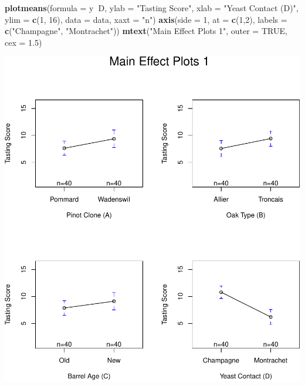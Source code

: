 \documentclass[]{article}
\newenvironment{Shaded}{\begin{snugshade}}{\end{snugshade}}
\newcommand{\DataTypeTok}[1]{\textcolor[rgb]{0.13,0.29,0.53}{#1}}
\newcommand{\DecValTok}[1]{\textcolor[rgb]{0.00,0.00,0.81}{#1}}
\newcommand{\FloatTok}[1]{\textcolor[rgb]{0.00,0.00,0.81}{#1}}
\newcommand{\KeywordTok}[1]{\textcolor[rgb]{0.13,0.29,0.53}{\textbf{#1}}}
\newcommand{\NormalTok}[1]{#1}
\newcommand{\OperatorTok}[1]{\textcolor[rgb]{0.81,0.36,0.00}{\textbf{#1}}}
\newcommand{\OtherTok}[1]{\textcolor[rgb]{0.56,0.35,0.01}{#1}}
\newcommand{\StringTok}[1]{\textcolor[rgb]{0.31,0.60,0.02}{#1}}
\begin{document}
\begin{Shaded}
\begin{Highlighting}[]
\KeywordTok{plotmeans}\NormalTok{(}\DataTypeTok{formula =}\NormalTok{ y}\OperatorTok{~}\NormalTok{D, }\DataTypeTok{ylab =} \StringTok{"Tasting Score"}\NormalTok{, }\DataTypeTok{xlab =} \StringTok{"Yeast Contact (D)"}\NormalTok{, }\DataTypeTok{ylim =} \KeywordTok{c}\NormalTok{(}\DecValTok{1}\NormalTok{, }\DecValTok{16}\NormalTok{), }\DataTypeTok{data =}\NormalTok{ data, }\DataTypeTok{xaxt =} \StringTok{"n"}\NormalTok{)}
\KeywordTok{axis}\NormalTok{(}\DataTypeTok{side =} \DecValTok{1}\NormalTok{, }\DataTypeTok{at =} \KeywordTok{c}\NormalTok{(}\DecValTok{1}\NormalTok{,}\DecValTok{2}\NormalTok{), }\DataTypeTok{labels =} \KeywordTok{c}\NormalTok{(}\StringTok{"Champagne"}\NormalTok{, }\StringTok{"Montrachet"}\NormalTok{))}
\KeywordTok{mtext}\NormalTok{(}\StringTok{"Main Effect Plots 1"}\NormalTok{, }\DataTypeTok{outer =} \OtherTok{TRUE}\NormalTok{, }\DataTypeTok{cex =} \FloatTok{1.5}\NormalTok{)}
\end{Highlighting}
\end{Shaded}

\includegraphics{wine_tasting_files/figure-latex/unnamed-chunk-7-1.pdf}
\end{document}
